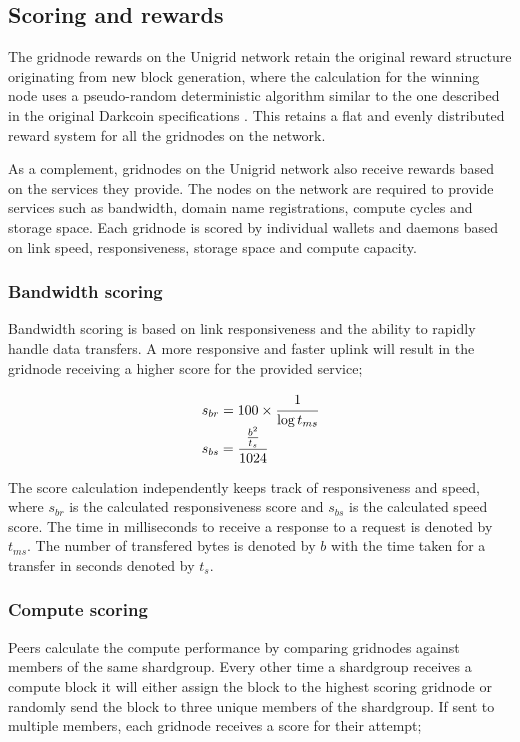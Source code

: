 \documentclass[10pt,a4paper,final]{article}
\begin{document}
\subsection{Scoring and rewards}
\label{section:scoring}
The \gls{gridnode} rewards on the Unigrid network retain the original reward structure originating from new block generation, where the calculation for the winning node uses a pseudo-random deterministic algorithm similar to the one described in the original Darkcoin specifications \cite{darkcoin2014}. This retains a flat and evenly distributed reward system for all the \glspl{gridnode} on the network.

As a complement, \glspl{gridnode} on the Unigrid network also receive rewards based on the services they provide. The nodes on the network are required to provide services such as bandwidth, domain name registrations, compute cycles and storage space. Each \gls{gridnode} is scored by individual wallets and daemons based on link speed, responsiveness, storage space and compute capacity.

\subsubsection{Bandwidth scoring}
Bandwidth scoring is based on link responsiveness and the ability to rapidly handle data transfers. A more responsive and faster uplink will result in the \gls{gridnode} receiving a higher score for the provided service;

\[
	\begin{array}{l}
	s_{br} = 100 \times \cfrac{1}{\log t_{ms}}\\
	s_{bs} = \cfrac{\frac{b^2}{t_s}}{1024}
	\end{array}
\]

\medskip
\noindent The score calculation independently keeps track of responsiveness and speed, where $s_{br}$ is the calculated responsiveness score and $s_{bs}$ is the calculated speed score. The time in milliseconds to receive a response to a request is denoted by $t_{ms}$. The number of transfered bytes is denoted by $b$ with the time taken for a transfer in seconds denoted by $t_s$.

\subsubsection{Compute scoring}
Peers calculate the compute performance by comparing \glspl{gridnode} against members of the same \gls{shardgroup}. Every other time a \gls{shardgroup} receives a compute block it will either assign the block to the highest scoring \gls{gridnode} or randomly send the block to three unique members of the \gls{shardgroup}. If sent to multiple members, each \gls{gridnode} receives a score for their attempt;
\end{document}
